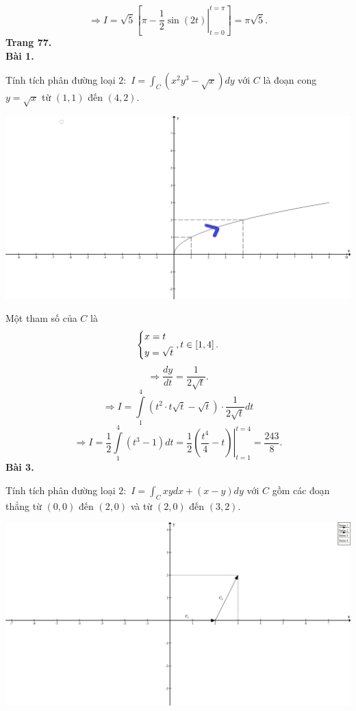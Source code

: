 \documentclass[12pt,a4paper]{article}
\begin{document}
\[ \Rightarrow I = \sqrt 5 \left[ {\pi  - \left. {\frac{1}{2}\sin \left( {2t} \right)} \right|_{t = 0}^{t = \pi }} \right] = \pi \sqrt 5 .\]
\textbf{Trang 77.}\\
\textbf{Bài 1.}
\begin{mybox}
Tính tích phân đường loại \(2:\) \(I = \int_C {\left( {{x^2}{y^3} - \sqrt x } \right)}dy \) với \(C\) là đoạn cong \(y = \sqrt x \) từ \(\left( {1,1} \right)\) đến \(\left( {4,2} \right).\)
\end{mybox}
\begin{center}
	\includegraphics[scale=0.3]{c4_3}
\end{center}
Một tham số của \(C\) là
\[\left\{ \begin{gathered}
  x = t \hfill \\
  y = \sqrt t  \hfill \\ 
\end{gathered}  \right.,t \in \left[ {1,4} \right].\]
\[ \Rightarrow \frac{{dy}}{{dt}} = \frac{1}{{2\sqrt t }}.\]
\[ \Rightarrow I = \int\limits_1^4 {\left( {{t^2} \cdot t\sqrt t  - \sqrt t } \right)}  \cdot \frac{1}{{2\sqrt t }}dt\]
\[ \Rightarrow I = \frac{1}{2}\int\limits_1^4 {\left( {{t^3} - 1} \right)dt = \frac{1}{2}} \left. {\left( {\frac{{{t^4}}}{4} - t} \right)} \right|_{t = 1}^{t = 4} = \frac{{243}}{8}.\]
\textbf{Bài 3.}
\begin{mybox}
Tính tích phân đường loại \(2:\) \(I = \int_C {xydx + \left( {x - y} \right)dy} \) với \(C\) gồm các đoạn thẳng từ \(\left( {0,0} \right)\) đến \(\left( {2,0} \right)\) và từ \(\left( {2,0} \right)\) đến \(\left( {3,2} \right).\)
\end{mybox}
\begin{center}
	\includegraphics[scale=0.3]{c4_4}
\end{center}
\end{document}
